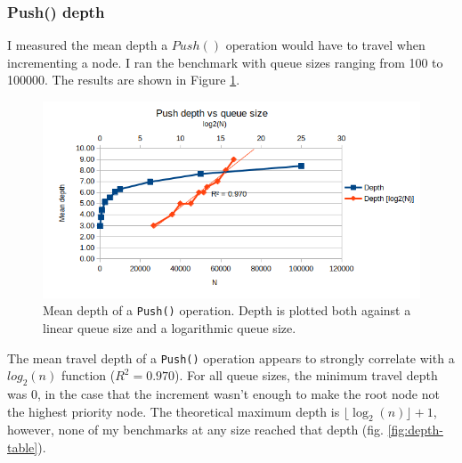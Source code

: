 \documentclass[a4paper,11pt]{article}
\begin{document}
    \subsubsection*{Push() depth}

    I measured the mean depth a $Push()$ operation would have to travel when incrementing a node. I ran the benchmark with queue sizes ranging from 100 to 100000. The results are shown in Figure \ref{fig:push-depth}.

    \begin{figure}[H]
        \centering
        \includegraphics[width=\textwidth]{depth.png}
        \caption{Mean depth of a \texttt{Push()} operation. Depth is plotted both against a linear queue size and a logarithmic queue size.}
        \label{fig:push-depth}
    \end{figure}

    The mean travel depth of a \texttt{Push()} operation appears to strongly correlate with a $log_2({n})$ function ($R^2=0.970$). For all queue sizes, the minimum travel depth was 0, in the case that the increment wasn't enough to make the root node not the highest priority node. The theoretical maximum depth is $\lfloor \log_2{(n)}\rfloor + 1$, however, none of my benchmarks at any size reached that depth (fig. \ref{fig:depth-table}).
\end{document}
